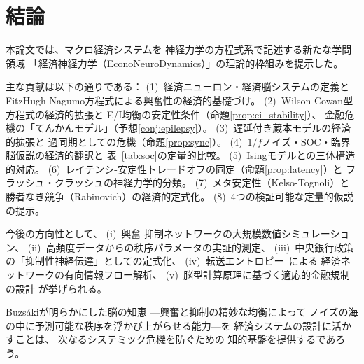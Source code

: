 \documentclass[12pt,twocolumn]{ltjsarticle}
\begin{document}
\section{結論}
\label{sec:conclusion}

本論文では、マクロ経済システムを
神経力学の方程式系で記述する新たな学問領域
「経済神経力学（EconoNeuroDynamics）」の理論的枠組みを提示した。

主な貢献は以下の通りである：
(1)~経済ニューロン・経済脳システムの定義と
FitzHugh-Nagumo方程式による興奮性の経済的基礎づけ。
(2)~Wilson-Cowan型方程式の経済的拡張と
E/I均衡の安定性条件（命題\ref{prop:ei_stability}）、
金融危機の「てんかんモデル」（予想\ref{conj:epilepsy}）。
(3)~遅延付き蔵本モデルの経済的拡張と
過同期としての危機（命題\ref{prop:sync}）。
(4)~$1/f$ノイズ・SOC・臨界脳仮説の経済的翻訳と
表~\ref{tab:soc}の定量的比較。
(5)~Isingモデルとの三体構造的対応。
(6)~レイテンシ-安定性トレードオフの同定（命題\ref{prop:latency}）と
フラッシュ・クラッシュの神経力学的分類。
(7)~メタ安定性（Kelso-Tognoli）と
勝者なき競争（Rabinovich）の経済的定式化。
(8)~4つの検証可能な定量的仮説の提示。

今後の方向性として、
(i)~興奮-抑制ネットワークの大規模数値シミュレーション、
(ii)~高頻度データからの秩序パラメータの実証的測定、
(iii)~中央銀行政策の「抑制性神経伝達」としての定式化、
(iv)~転送エントロピー~\cite{Vicente2011}による
経済ネットワークの有向情報フロー解析、
(v)~脳型計算原理に基づく適応的金融規制の設計
が挙げられる。

Buzs\'{a}kiが明らかにした脳の知恵
---興奮と抑制の精妙な均衡によって
ノイズの海の中に予測可能な秩序を浮かび上がらせる能力---を
経済システムの設計に活かすことは、
次なるシステミック危機を防ぐための
知的基盤を提供するであろう。
\end{document}
